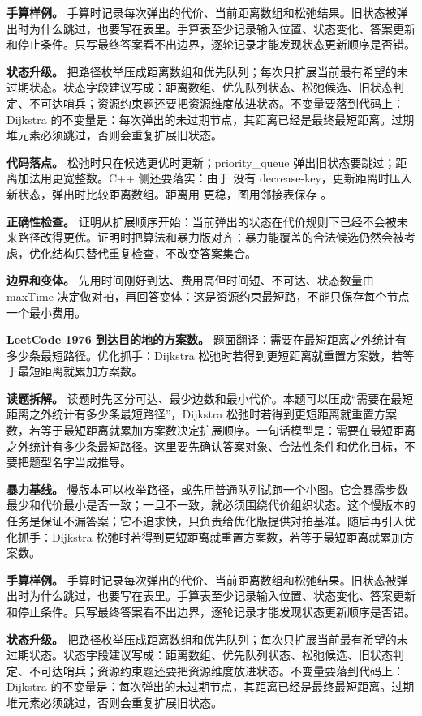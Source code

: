 \textbf{手算样例。} 手算时记录每次弹出的代价、当前距离数组和松弛结果。旧状态被弹出时为什么跳过，也要写在表里。手算表至少记录输入位置、状态变化、答案更新和停止条件。只写最终答案看不出边界，逐轮记录才能发现状态更新顺序是否错。

\textbf{状态升级。} 把路径枚举压成距离数组和优先队列；每次只扩展当前最有希望的未过期状态。状态字段建议写成：距离数组、优先队列状态、松弛候选、旧状态判定、不可达哨兵；资源约束题还要把资源维度放进状态。不变量要落到代码上：Dijkstra 的不变量是：每次弹出的未过期节点，其距离已经是最终最短距离。过期堆元素必须跳过，否则会重复扩展旧状态。

\textbf{代码落点。} 松弛时只在候选更优时更新；priority\_queue 弹出旧状态要跳过；距离加法用更宽整数。C++ 侧还要落实：由于  没有 decrease-key，更新距离时压入新状态，弹出时比较距离数组。距离用  更稳，图用邻接表保存 。

\textbf{正确性检查。} 证明从扩展顺序开始：当前弹出的状态在代价规则下已经不会被未来路径改得更优。证明时把算法和暴力版对齐：暴力能覆盖的合法候选仍然会被考虑，优化结构只替代重复检查，不改变答案集合。

\textbf{边界和变体。} 先用时间刚好到达、费用高但时间短、不可达、状态数量由 maxTime 决定做对拍，再回答变体：这是资源约束最短路，不能只保存每个节点一个最小费用。

\noindent\textbf{LeetCode 1976 到达目的地的方案数。} 题面翻译：需要在最短距离之外统计有多少条最短路径。优化抓手：Dijkstra 松弛时若得到更短距离就重置方案数，若等于最短距离就累加方案数。

\textbf{读题拆解。} 读题时先区分可达、最少边数和最小代价。本题可以压成“需要在最短距离之外统计有多少条最短路径”，Dijkstra 松弛时若得到更短距离就重置方案数，若等于最短距离就累加方案数决定扩展顺序。一句话模型是：需要在最短距离之外统计有多少条最短路径。这里要先确认答案对象、合法性条件和优化目标，不要把题型名字当成推导。

\textbf{暴力基线。} 慢版本可以枚举路径，或先用普通队列试跑一个小图。它会暴露步数最少和代价最小是否一致；一旦不一致，就必须围绕代价组织状态。这个慢版本的任务是保证不漏答案；它不追求快，只负责给优化版提供对拍基准。随后再引入优化抓手：Dijkstra 松弛时若得到更短距离就重置方案数，若等于最短距离就累加方案数。

\textbf{手算样例。} 手算时记录每次弹出的代价、当前距离数组和松弛结果。旧状态被弹出时为什么跳过，也要写在表里。手算表至少记录输入位置、状态变化、答案更新和停止条件。只写最终答案看不出边界，逐轮记录才能发现状态更新顺序是否错。

\textbf{状态升级。} 把路径枚举压成距离数组和优先队列；每次只扩展当前最有希望的未过期状态。状态字段建议写成：距离数组、优先队列状态、松弛候选、旧状态判定、不可达哨兵；资源约束题还要把资源维度放进状态。不变量要落到代码上：Dijkstra 的不变量是：每次弹出的未过期节点，其距离已经是最终最短距离。过期堆元素必须跳过，否则会重复扩展旧状态。

